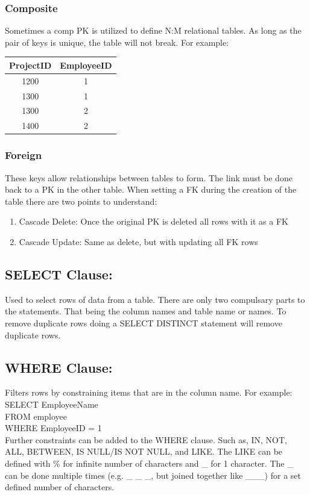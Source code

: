 \documentclass[a5paper]{article}
\begin{document}
	\subsubsection{Composite}
	Sometimes a comp PK is utilized to define N:M relational tables. As long as the pair of keys is unique, the table will not break. For example:
	\begin{center}
	\begin{tabular}{ c | c }
		ProjectID & EmployeeID\\
		\hline
		1200 & 1\\
		1300 & 1\\
		1300 & 2\\
		1400 & 2
	\end{tabular}
	\end{center}
	\subsubsection{Foreign}
	These keys allow relationships between tables to form. The link must be done back to a PK in the other table. When setting a FK during the creation of the table there are two points to understand:
	\begin{enumerate}
		\item Cascade Delete: Once the original PK is deleted all rows with it as a FK
		\item Cascade Update: Same as delete, but with updating all FK rows
	\end{enumerate}
	\subsection{SELECT Clause:}
	Used to select rows of data from a table. There are only two compulsary parts to the statements. That being the column names and table name or names. To remove duplicate rows doing a SELECT DISTINCT statement will remove duplicate rows.
	\subsection{WHERE Clause:}
	Filters rows by constraining items that are in the column name. For example:\\
	SELECT EmployeeName\\
	FROM employee\\
	WHERE EmployeeID = 1\\[1\baselineskip]
	Further constraints can be added to the WHERE clause. Such as, IN, NOT, ALL, BETWEEN, IS NULL/IS NOT NULL, and LIKE. The LIKE can be defined with \% for infinite number of characters and \_ for 1 character. The \_ can be done multiple times (e.g. \_ \_ \_, but joined together like \_\_\_) for a set defined number of characters.
\end{document}
